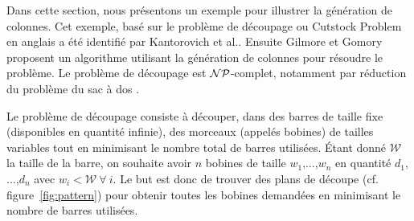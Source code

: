 Dans cette section, nous présentons un exemple pour illustrer la génération de colonnes. 
Cet exemple, basé sur le problème de découpage ou Cutstock Problem en anglais a été identifié par Kantorovich et al.\cite{kantorovich1960mathematical}. 
Ensuite Gilmore et Gomory \cite{gilmore1961linear} proposent un algorithme utilisant la génération de colonnes pour résoudre le problème.
Le problème de découpage est $\mathcal{NP}$-complet, notamment  par réduction du problème du sac à dos \cite{Karp1972}.

Le problème de découpage consiste à découper, dans des barres de taille fixe (disponibles en quantité infinie), des morceaux (appelés bobines) de tailles variables tout en minimisant le nombre total de barres utilisées.
Étant donné $\mathcal{W}$ la taille de la barre, on souhaite avoir $n$ bobines de taille $w_1$,$\ldots$,$w_n$ en quantité $d_1$,$\ldots$,$d_n$ avec $ w_i < \mathcal{W}~ \forall ~ i $.
Le but est donc de trouver des plans de découpe (cf. figure~\ref{fig:pattern}) pour obtenir toutes les bobines demandées en minimisant le nombre de barres utilisées.

